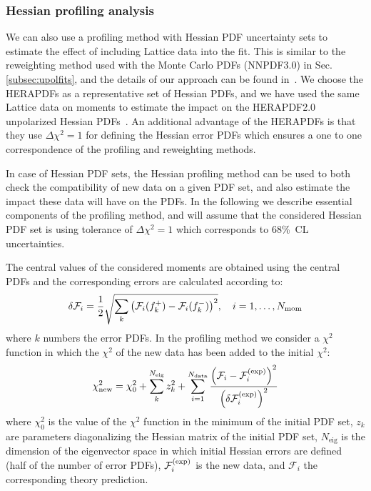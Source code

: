 \subsubsection{Hessian profiling analysis}
\label{sec:hessianprofiling}



We can also use a profiling method with Hessian PDF uncertainty sets  
to estimate the effect of including Lattice data into the fit. 
This is similar to the  reweighting method used with the Monte Carlo PDFs (NNPDF3.0) 
in Sec.\ref{subsec:upolfits},
and the details of our approach can be found in~\cite{Paukkunen:2014zia,Camarda:2015zba}.
%
We choose the HERAPDFs as a representative set of Hessian PDFs, and 
we have used the same Lattice data on moments to estimate the impact
on the HERAPDF2.0 unpolarized Hessian PDFs~\cite{Abramowicz:2015mha}. 
%
An additional advantage of the HERAPDFs is that they use
$\Delta\chi^2=1$ for defining the Hessian error PDFs which ensures a
one to one correspondence of the profiling and reweighting methods.


In case of Hessian PDF sets, the Hessian profiling method
can be used to both check the compatibility of new data on a given PDF set,
and also  estimate the impact these data will have on the PDFs. 
In the following we describe essential components of the profiling method, 
and will assume  that the considered Hessian PDF set is using tolerance of $\Delta\chi^2=1$ 
which corresponds to 68\%~CL uncertainties.



The central values of the considered moments are obtained using the central PDFs and the corresponding
errors are calculated according to:
\begin{equation}
\delta\mathcal{F}_i = \frac{1}{2} \sqrt{\sum_{k}\left(\mathcal{F}_i(f_k^+)-\mathcal{F}_i(f_k^-)\right)^2},
\quad i=1,\ldots,N_{\rm mom}
\end{equation}
where $k$ numbers the error PDFs.
%
In the profiling method we consider a $\chi^2$ function in which the $\chi^2$ of the new
data has been added to the initial $\chi^2$:
\begin{equation}
\label{eq:newchi2}
\chi^2_{\text{new}} = \chi_0^2 + \sum_{k}^{N_{\text{eig}}} z_k^2
                    + \sum_{i=1}^{N_{\text{data}}}
                      \frac{\lp \mathcal{F}_i - \mathcal{F}_i^{\rm(exp)}\rp^2}
                           {\lp\delta\mathcal{F}_i^{\rm(exp)}\rp^2}
\end{equation}
where $\chi^2_0$ is the value of the $\chi^2$ function in the minimum of the initial PDF set,
$z_k$ are parameters diagonalizing the Hessian matrix of the initial PDF set,
$N_{\text{eig}}$ is the dimension of the eigenvector space in which initial Hessian errors are defined
(half of the number of error PDFs), $\mathcal{F}_i^{\rm(exp)}$ is the new data,
and $\mathcal{F}_i$ the corresponding theory prediction.

